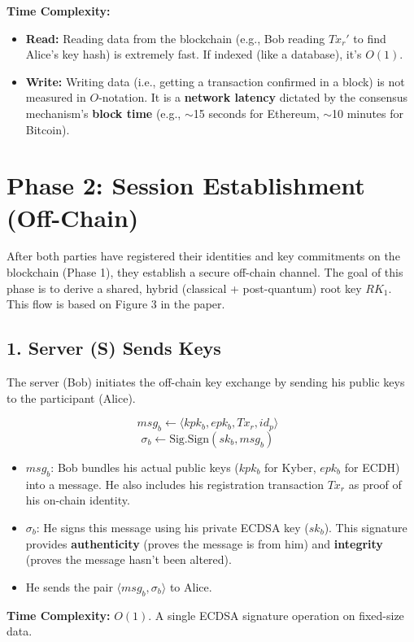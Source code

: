 \documentclass[12pt]{article}
\begin{document}
\textbf{Time Complexity:}
\begin{itemize}
    \item \textbf{Read:} Reading data from the blockchain (e.g., Bob reading $Tx_r'$ to find Alice's key hash) is extremely fast. If indexed (like a database), it's \textbf{$O(1)$}.
    \item \textbf{Write:} Writing data (i.e., getting a transaction confirmed in a block) is not measured in $O$-notation. It is a \textbf{network latency} dictated by the consensus mechanism's \textbf{block time} (e.g., $\sim$15 seconds for Ethereum, $\sim$10 minutes for Bitcoin).
\end{itemize}

\newpage

\section*{Phase 2: Session Establishment (Off-Chain)}

After both parties have registered their identities and key commitments on the blockchain (Phase 1), they establish a secure off-chain channel. The goal of this phase is to derive a shared, hybrid (classical + post-quantum) root key \( RK_1 \). This flow is based on Figure 3 in the paper.



\subsection*{1. Server (S) Sends Keys}
The server (Bob) initiates the off-chain key exchange by sending his public keys to the participant (Alice).

\[
msg_b \leftarrow \langle kpk_b, epk_b, Tx_r, id_p \rangle \text{ }
\]
\[
\sigma_b \leftarrow \text{Sig.Sign}(sk_b, msg_b) \text{ }
\]

\begin{itemize}
    \item \textbf{\(msg_b\)}: Bob bundles his actual public keys (\(kpk_b\) for Kyber, \(epk_b\) for ECDH) into a message. He also includes his registration transaction \(Tx_r\) as proof of his on-chain identity.
    \item \textbf{\(\sigma_b\)}: He signs this message using his private ECDSA key (\(sk_b\)). This signature provides \textbf{authenticity} (proves the message is from him) and \textbf{integrity} (proves the message hasn't been altered).
    \item He sends the pair \( \langle msg_b, \sigma_b \rangle \) to Alice.
\end{itemize}
\textbf{Time Complexity:} \( O(1) \). A single ECDSA signature operation on fixed-size data.
\end{document}
